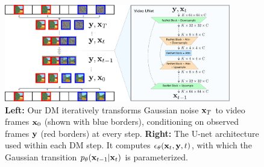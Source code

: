 \begin{figure}[t]
    \centering
    \includegraphics[width=0.88\textwidth]{figs/fdm/video-architecture-v8.pdf}
    \caption{\textbf{Left:} Our DM iteratively transforms Gaussian noise ${\mathbf{x}}_T$ to video frames ${\mathbf{x}}_0$ (shown with blue borders), conditioning on observed frames ${\mathbf{y}}$ (red borders) at every step. \textbf{Right:} The U-net architecture used within each DM step. It computes $\epsilon_\theta({\mathbf{x}}_t, {\mathbf{y}}, t)$, with which the Gaussian transition $p_\theta({\mathbf{x}}_{t-1}|{\mathbf{x}}_t)$ is parameterized.
    }
    \label{fig:architecture}
\end{figure}

